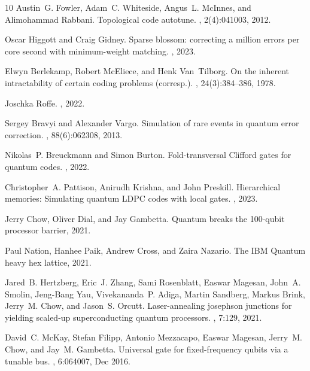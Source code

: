 \documentclass{article}
\begin{document}
\begin{thebibliography}{10}
	Austin~G. Fowler, Adam~C. Whiteside, Angus~L. McInnes, and Alimohammad Rabbani.
	\newblock Topological code autotune.
	, 2(4):041003, 2012.
	
	Oscar Higgott and Craig Gidney.
	\newblock Sparse blossom: correcting a million errors per core second with
	minimum-weight matching.
	, 2023.
	
	Elwyn Berlekamp, Robert McEliece, and Henk Van~Tilborg.
	\newblock On the inherent intractability of certain coding problems (corresp.).
	, 24(3):384--386, 1978.
	
	Joschka Roffe.
	, 2022.
	
	Sergey Bravyi and Alexander Vargo.
	\newblock Simulation of rare events in quantum error correction.
	, 88(6):062308, 2013.
	
	Nikolas~P. Breuckmann and Simon Burton.
	\newblock Fold-transversal {C}lifford gates for quantum codes.
	, 2022.
	
	Christopher~A. Pattison, Anirudh Krishna, and John Preskill.
	\newblock Hierarchical memories: Simulating quantum {LDPC} codes with local
	gates.
	, 2023.
	
	Jerry Chow, Oliver Dial, and Jay Gambetta.
	 {Q}uantum breaks the 100‑qubit processor barrier, 2021.
	
	Paul Nation, Hanhee Paik, Andrew Cross, and Zaira Nazario.
	\newblock The {IBM} {Q}uantum heavy hex lattice, 2021.
	
	Jared~B. Hertzberg, Eric~J. Zhang, Sami Rosenblatt, Easwar Magesan, John~A.
	Smolin, Jeng-Bang Yau, Vivekananda~P. Adiga, Martin Sandberg, Markus Brink,
	Jerry~M. Chow, and Jason~S. Orcutt.
	\newblock Laser-annealing josephson junctions for yielding scaled-up
	superconducting quantum processors.
	, 7:129, 2021.
	
	David~C. McKay, Stefan Filipp, Antonio Mezzacapo, Easwar Magesan, Jerry~M.
	Chow, and Jay~M. Gambetta.
	\newblock Universal gate for fixed-frequency qubits via a tunable bus.
	, 6:064007, Dec 2016.
	

\end{thebibliography}
\end{document}
